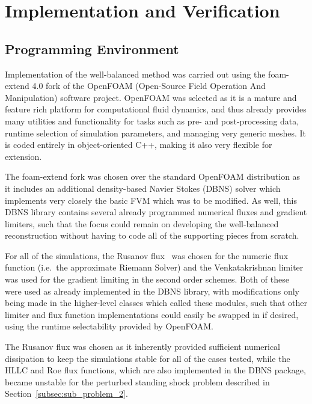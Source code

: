 \chapter{Implementation and Verification}
\label{chap:implementation}

\section{Programming Environment}
\label{sec:environment}

Implementation of the well-balanced method was carried out using the foam-extend 4.0 fork of the OpenFOAM (Open-Source Field Operation And Manipulation) software project. OpenFOAM was selected as it is a mature and feature rich platform for computational fluid dynamics, and thus already provides many utilities and functionality for tasks such as pre- and post-processing data, runtime selection of simulation parameters, and managing very generic meshes. It is coded entirely in object-oriented C++, making it also very flexible for extension.

The foam-extend fork was chosen over the standard OpenFOAM distribution as it includes an additional density-based Navier Stokes (DBNS) solver which implements very closely the basic FVM which was to be modified. As well, this DBNS library contains several already programmed numerical fluxes and gradient limiters, such that the focus could remain on developing the well-balanced reconstruction without having to code all of the supporting pieces from scratch.

For all of the simulations, the Rusanov flux~\cite{Rusanov1961} was chosen for the numeric flux function (i.e.\ the approximate Riemann Solver) and the Venkatakrishnan limiter~\cite{Venkatakrishnan1993,Venkatakrishnan1995} was used for the gradient limiting in the second order schemes. Both of these were used as already implemented in the DBNS library, with modifications only being made in the higher-level classes which called these modules, such that other limiter and flux function implementations could easily be swapped in if desired, using the runtime selectability provided by OpenFOAM.

The Rusanov flux was chosen as it inherently provided sufficient numerical dissipation to keep the simulations stable for all of the cases tested, while the HLLC and Roe flux functions, which are also implemented in the DBNS package, became unstable for the perturbed standing shock problem described in Section~\ref{subsec:sub_problem_2}.

